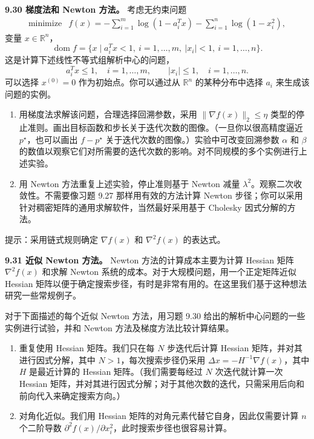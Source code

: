 \documentclass[UTF8,12pt,a4paper,fontset=fandol]{ctexart}
\begin{document}
\noindent\textbf{9.30 梯度法和 Newton 方法。}\quad
考虑无约束问题
\[
\begin{array}{ll}
\mbox{minimize} & f(x)=-\displaystyle\sum_{i=1}^m\log(1-a_i^Tx)-\sum_{i=1}^n\log(1-x_i^2),
\end{array}
\]
变量 $x\in\mathbb{R}^n$，
\[
\operatorname{dom} f=\{x\mid a_i^Tx<1,\ i=1,\ldots,m,\ |x_i|<1,\ i=1,\ldots,n\}.
\]
这是计算下述线性不等式组解析中心的问题，
\[
a_i^Tx\leq1,\quad i=1,\ldots,m,\qquad |x_i|\leq1,\quad i=1,\ldots,n.
\]
可以选择 $x^{(0)}=0$ 作为初始点。你可以通过从 $\mathbb{R}^n$ 的某种分布中选择 $a_i$ 来生成该问题的实例。
\begin{enumerate}
\item[(a)] 用梯度法求解该问题，合理选择回溯参数，采用 $\|\nabla f(x)\|_2\leq\eta$ 类型的停止准则。画出目标函数和步长关于迭代次数的图像。（一旦你以很高精度逼近 $p^\star$，也可以画出 $f-p^\star$ 关于迭代次数的图像。）实验中可改变回溯参数 $\alpha$ 和 $\beta$ 的数值以观察它们对所需要的迭代次数的影响。对不同规模的多个实例进行上述实验。
\item[(b)] 用 Newton 方法重复上述实验，停止准则基于 Newton 减量 $\lambda^2$。观察二次收敛性。不需要像习题 9.27 那样用有效的方法计算 Newton 步径；你可以采用针对稠密矩阵的通用求解软件，当然最好采用基于 Cholesky 因式分解的方法。
\end{enumerate}
提示：采用链式规则确定 $\nabla f(x)$ 和 $\nabla^2 f(x)$ 的表达式。

\noindent\textbf{9.31 近似 Newton 方法。}\quad
Newton 方法的计算成本主要为计算 Hessian 矩阵 $\nabla^2 f(x)$ 和求解 Newton 系统的成本。对于大规模问题，用一个正定矩阵近似 Hessian 矩阵以便于确定搜索步径，有时是非常有用的。在这里我们基于这种想法研究一些常规例子。

对于下面描述的每个近似 Newton 方法，用习题 9.30 给出的解析中心问题的一些实例进行试验，并和 Newton 方法及梯度方法比较计算结果。
\begin{enumerate}
\item[(a)] 重复使用 Hessian 矩阵。我们只在每 $N$ 步迭代后计算 Hessian 矩阵，并对其进行因式分解，其中 $N>1$，每次搜索步径仍采用 $\Delta x=-H^{-1}\nabla f(x)$，其中 $H$ 是最近计算的 Hessian 矩阵。（我们需要每经过 $N$ 次迭代就计算一次 Hessian 矩阵，并对其进行因式分解；对于其他次数的迭代，只需采用后向和前向代入来确定搜索方向。）
\item[(b)] 对角化近似。我们用 Hessian 矩阵的对角元素代替它自身，因此仅需要计算 $n$ 个二阶导数 $\partial^2 f(x)/\partial x_i^2$，此时搜索步径也很容易计算。
\end{enumerate}
\end{document}
